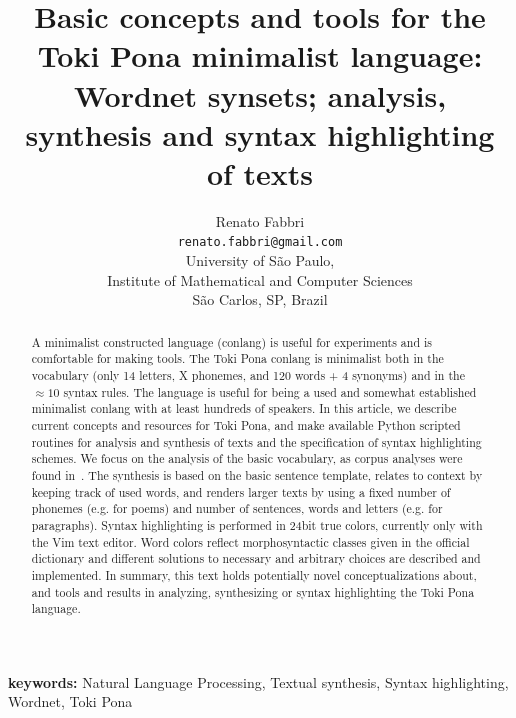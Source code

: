 \documentclass{article}
\begin{document}
\title{Basic concepts and tools for the Toki Pona minimalist language:
Wordnet synsets; analysis, synthesis and syntax highlighting of texts}
\author{Renato Fabbri\\
\texttt{renato.fabbri@gmail.com}\\
University of São Paulo,\\
Institute of Mathematical and Computer Sciences\\
São Carlos, SP, Brazil
}
\maketitle
\begin{abstract}
  A minimalist constructed language (conlang)
  is useful for experiments and is comfortable for making tools.
  The Toki Pona conlang is minimalist both in the vocabulary
  (only 14 letters, X phonemes, and 120 words + 4 synonyms)
  and in the $\approx10$ syntax rules.
  The language is useful for being a used and somewhat established
  minimalist conlang with at least hundreds of speakers.
  In this article, we describe current concepts and resources
  for Toki Pona,
  and make available Python scripted routines for
  analysis and synthesis of texts and the specification of syntax highlighting schemes.
  We focus on the analysis of the basic vocabulary,
  as corpus analyses were found in~\cite{corpus}.
  The synthesis is based on the basic sentence template,
  relates to context by keeping track of used words,
  and renders larger texts by using a fixed number of phonemes (e.g. for poems)
  and number of sentences, words and letters (e.g. for paragraphs).
  Syntax highlighting is performed in 24bit true colors, currently only
  with the Vim text editor.
  Word colors reflect morphosyntactic classes given in the official dictionary
  and different solutions to necessary and arbitrary choices are described and implemented.
  In summary, this text holds potentially novel conceptualizations about,
  and tools and results in analyzing, synthesizing or syntax highlighting the
  Toki Pona language.
\end{abstract}
{\bf keywords:} Natural Language Processing, Textual synthesis, Syntax highlighting, Wordnet, Toki Pona
\end{document}
